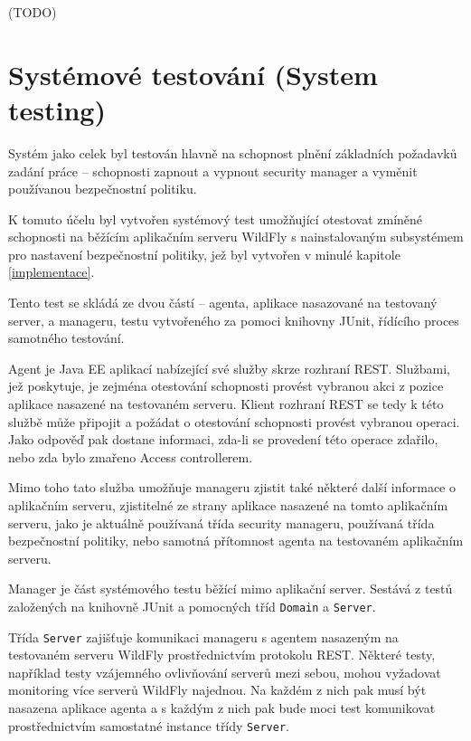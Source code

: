 (TODO)


\section{Systémové testování (System testing)}

Systém jako celek byl testován hlavně na schopnost plnění základních požadavků zadání práce -- schopnosti zapnout a vypnout security manager a vyměnit používanou bezpečnostní politiku.

K tomuto účelu byl vytvořen systémový test umožňující otestovat zmíněné schopnosti na běžícím aplikačním serveru WildFly s nainstalovaným subsystémem pro nastavení bezpečnostní politiky, jež byl vytvořen v minulé kapitole \ref{implementace}.

Tento test se skládá ze dvou částí -- agenta, aplikace nasazované na testovaný server, a manageru, testu vytvořeného za pomoci knihovny JUnit, řídícího proces samotného testování.

Agent je Java EE aplikací nabízející své služby skrze rozhraní REST. Službami, jež poskytuje, je zejména otestování schopnosti provést vybranou akci z pozice aplikace nasazené na testovaném serveru. Klient rozhraní REST se tedy k této službě může připojit a požádat o otestování schopnosti provést vybranou operaci. Jako odpověď pak dostane informaci, zda-li se provedení této operace zdařilo, nebo zda bylo zmařeno Access controllerem.

Mimo toho tato služba umožňuje manageru zjistit také některé další informace o aplikačním serveru, zjistitelné ze strany aplikace nasazené na tomto aplikačním serveru, jako je aktuálně používaná třída security manageru, používaná třída bezpečnostní politiky, nebo samotná přítomnost agenta na testovaném aplikačním serveru.

Manager je část systémového testu běžící mimo aplikační server. Sestává z testů založených na knihovně JUnit a pomocných tříd {\tt Domain} a {\tt Server}.

Třída {\tt Server} zajišťuje komunikaci manageru s agentem nasazeným na testovaném serveru WildFly prostřednictvím protokolu REST. Některé testy, například testy vzájemného ovlivňování serverů mezi sebou, mohou vyžadovat monitoring více serverů WildFly najednou. Na každém z nich pak musí být nasazena aplikace agenta a s každým z nich pak bude moci test komunikovat prostřednictvím samostatné instance třídy {\tt Server}.

